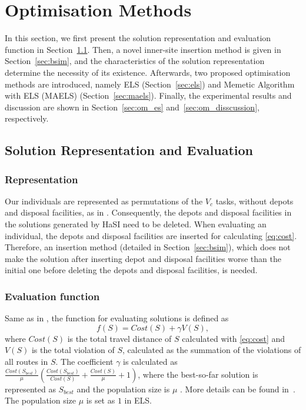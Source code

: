 \documentclass[journal]{IEEEtran}
\begin{document}
\section{Optimisation Methods}\label{sec:optimisation_mathod}
In this section, we first present the solution representation and evaluation function in Section~\ref{sec:sre}. Then, a novel inner-site insertion method is given in Section~\ref{sec:bsim}, and the characteristics of the solution representation determine the necessity of its existence. Afterwards, two proposed optimisation methods are introduced, namely ELS (Section~\ref{sec:els}) and Memetic Algorithm with ELS (MAELS) (Section~\ref{sec:maels}). Finally, the experimental results and discussion are shown in Section~\ref{sec:om_es} and~\ref{sec:om_disscussion}, respectively.

\subsection{Solution Representation and Evaluation}\label{sec:sre}

\subsubsection{Representation} 
Our individuals are represented as permutations of the $V_c$ tasks, without depots and disposal facilities, as in \cite{wang2015estimation}. Consequently, the depots and disposal facilities in the solutions generated by HaSI need to be deleted. When evaluating an individual, the depots and disposal facilities are inserted for calculating \eqref{eq:cost}. Therefore, an insertion method (detailed in Section~\ref{sec:bsim}), which does not make the solution after inserting depot and disposal facilities worse than the initial one before deleting the depots and disposal facilities, is needed.

\subsubsection{Evaluation function}
Same as in \cite{tang2009memetic}, the function for evaluating solutions is defined as
\begin{equation}\label{eq:eval}
f(S) = Cost(S) + \gamma V(S),
\end{equation}
where $Cost(S)$ is the total travel distance of $S$ calculated with \eqref{eq:cost} and $V(S)$ is the total violation of $S$, calculated as the summation of the violations of all routes in $S$. The coefficient $\gamma$ is calculated as $\frac{Cost(S_{best})}{\mu} (\frac{Cost(S_{best})}{Cost(S)}+\frac{Cost(S)}{\mu}+1)$, where the best-so-far solution is represented as $S_{best}$ and the population size is $\mu$ . More details can be found in~\cite{tang2009memetic}. The population size $\mu$ is set as $1$ in ELS.
\end{document}

